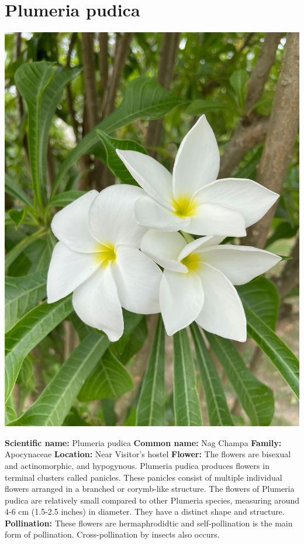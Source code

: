 \documentclass{article}
\begin{document}
\section{Plumeria pudica}
\begin{center}
    \includegraphics[scale=0.13]{images/pp.jpg}
\end{center}
\textbf{Scientific name:} Plumeria pudica\newline
\textbf{Common name:} Nag Champa\newline
\textbf{Family:} Apocynaceae\newline
\textbf{Location:} Near Visitor's hostel\newline
\textbf{Flower:} The flowers are bisexual and actinomorphic, and hypogynous. Plumeria pudica produces flowers in terminal clusters called panicles. These panicles consist of multiple individual flowers arranged in a branched or corymb-like structure. The flowers of Plumeria pudica are relatively small compared to other Plumeria species, measuring around 4-6 cm (1.5-2.5 inches) in diameter. They have a distinct shape and structure.\newline
\textbf{Pollination:} These flowers are hermaphrodidtic and self-pollination is the main form of pollination. Cross-pollination by insects also occurs.
\end{document}
